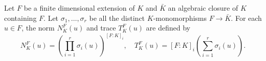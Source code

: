 Let $F$ be a finite dimensional extension of $K$ and $\bar{K}$ an algebraic closure of $K$ containing $F$. Let $\sigma_1, \ldots, \sigma_r$ be all the distinct $K$-monomorphisms $F \to \bar{K}$. For each $u \in F$, the norm $N_K^F(u)$ and trace $T_K^F(u)$ are defined by
$$N_K^F(u) = \left( \prod_{i=1}^{r} \sigma_i(u) \right)^{[F : K]_i}, \quad T_K^F(u) = [F : K]_i \left( \sum_{i=1}^{r} \sigma_i(u) \right).$$
